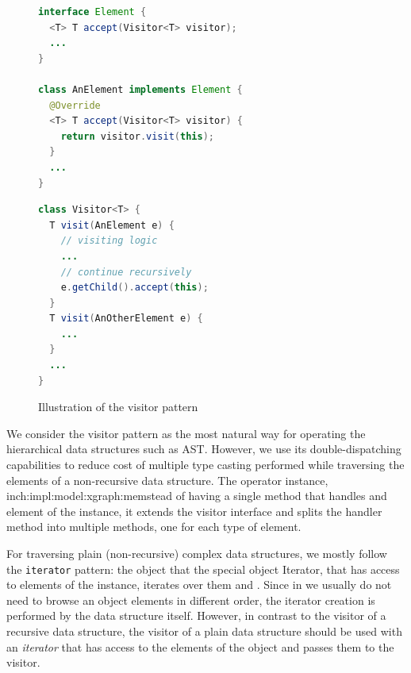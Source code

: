 \begin{figure}[h]
\centering
\begin{minipage}[t]{.55\textwidth}
\begin{lstlisting}[language=java]
interface Element {
  <T> T accept(Visitor<T> visitor);
  ...
}

class AnElement implements Element {
  @Override
  <T> T accept(Visitor<T> visitor) {
    return visitor.visit(this);
  }
  ...
}
\end{lstlisting}
\end{minipage}%
\begin{minipage}[t]{.45\textwidth}
\begin{lstlisting}[language=java]
class Visitor<T> {
  T visit(AnElement e) {
    // visiting logic
    ...
    // continue recursively
    e.getChild().accept(this);
  }
  T visit(AnOtherElement e) {
    ...
  }
  ...
}
\end{lstlisting}
\end{minipage}
\caption{Illustration of the visitor pattern}
\label{fig:visitor}
\end{figure}

We consider the visitor pattern as the most natural way for operating the hierarchical data structures such as AST.
However, we use its double-dispatching capabilities to reduce cost of multiple type casting performed while traversing the elements of a non-recursive data structure.
The operator instance, inch:impl:model:xgraph:memstead of having a single method that handles and element of the instance, it extends the visitor interface and splits the handler method into multiple methods, one for each type of element.

For traversing plain (non-recursive) complex data structures, we mostly follow the \texttt{iterator} pattern: the object that 
the special object Iterator, that has access to elements of the instance, iterates over them and . Since in \porthos[] we usually do not need to browse an object elements in different order, the iterator creation is performed by the data structure itself.
However, in contrast to the visitor of a recursive data structure, the visitor of a plain data structure should be used with an \textit{iterator} that has access to the elements of the object and passes them to the visitor.



